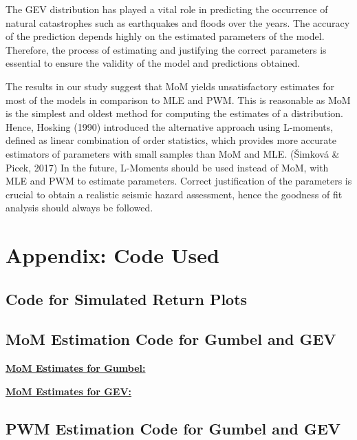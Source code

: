 \documentclass{article}
\begin{document}
The GEV distribution has played a vital role in predicting the occurrence of natural catastrophes such as earthquakes and floods over the years. The accuracy of the prediction depends highly on the estimated parameters of the model. Therefore, the process of estimating and justifying the correct parameters is essential to ensure the validity of the model and predictions obtained. 

The results in our study suggest that MoM yields unsatisfactory estimates for most of the models in comparison to MLE and PWM. This is reasonable as MoM is the simplest and oldest method for computing the estimates of a distribution. Hence, Hosking (1990) introduced the alternative approach using L-moments, defined as linear combination of order statistics, which provides more accurate estimators of parameters with small samples than MoM and MLE. (Šimková \& Picek, 2017) In the future, L-Moments should be used instead of MoM, with MLE and PWM to estimate parameters. Correct justification of the parameters is crucial to obtain a realistic seismic hazard assessment, hence the goodness of fit analysis should always be followed. 

\newpage

\section{Appendix: Code Used}

\subsection{Code for Simulated Return Plots}



\subsection{MoM Estimation Code for Gumbel and GEV}

\textbf{\underline{MoM Estimates for Gumbel:}}



\newpage

\textbf{\underline{MoM Estimates for GEV:}}



\subsection{PWM Estimation Code for Gumbel and GEV}
\end{document}
